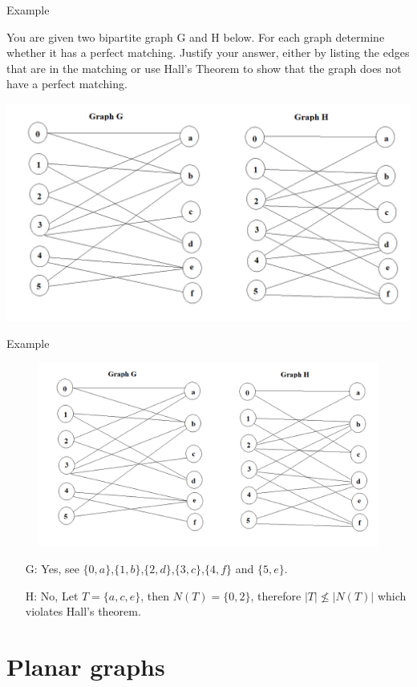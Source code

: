 \documentclass{beamer}
\theoremstyle{definition}
\begin{document}
\begin{frame}{Example}
    \begin{flushleft}
        You are given two bipartite graph G and H below. For each graph determine whether it has a perfect matching. Justify your answer, either by listing the edges that are in the matching or use Hall's Theorem to show that the graph does not have a perfect matching.
    \end{flushleft}
    \centering \includegraphics[width=.7\linewidth]{p6.jpg}
\end{frame}

\begin{frame}{Example}
    \centering 
    \begin{figure}
        \includegraphics[width=.7\linewidth]{p6.jpg}
    \end{figure}
    \begin{itemize}
        \item[G:] Yes, see $\{0,a\}$,$\{1,b\}$,$\{2,d\}$,$\{3,c\}$,$\{4,f\}$ and $\{5,e\}$.
        \item[H:] No, Let $T=\{a,c,e\}$, then $N(T)=\{0,2\}$, therefore $|T| \nleq |N(T)|$ which violates Hall's theorem.
    \end{itemize}
\end{frame}

\section{Planar graphs}
\end{document}
